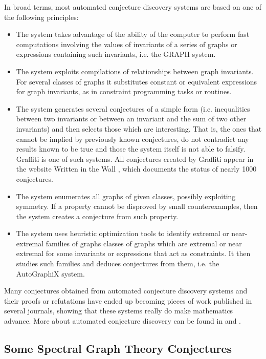 \documentclass[11pt]{article}
\theoremstyle{definition}
\begin{document}
In broad terms, most automated conjecture discovery systems are based on one of the following principles: 

\begin{itemize}[label=\raisebox{0.25ex}{\tiny$\bullet$}]
    \item The system takes advantage of the ability of the computer to perform fast computations involving the values of invariants of a series of graphs or expressions containing such invariants, i.e. the GRAPH system.
    \item The system exploits compilations of relationships between graph invariants. For several classes of graphs it substitutes constant or equivalent expressions for graph invariants, as in constraint programming tasks or routines.
    \item The system generates several conjectures of a simple form (i.e. inequalities between two invariants or between an invariant and the sum of two other invariants) and then selects those which are interesting. That is, the ones that cannot be implied by previously known conjectures, do not contradict any results known to be true and those the system itself is not able to falsify. Graffiti is one of such systems. All conjectures created by Graffiti appear in the website Written in the Wall \cite{WrittenWall}, which documents the status of nearly 1000 conjectures.
    \item The system enumerates all graphs of given classes, possibly exploiting symmetry. If a property cannot be disproved by small counterexamples, then the system creates a conjecture from such property. 
    \item The system uses heuristic optimization tools to identify extremal or near-extremal families of graphs classes of graphs which are extremal or near extremal for some invariants or expressions that act as constraints. It then studies such families and deduces conjectures from them, i.e. the AutoGraphiX system.
\end{itemize}

Many conjectures obtained from automated conjecture discovery systems and their proofs or refutations have ended up becoming pieces of work published in several journals, showing that these systems really do make mathematics advance.
More about automated conjecture discovery can be found in \cite{zbMATH05689445} and \cite{zbMATH02041897}. 

\subsection{Some Spectral Graph Theory Conjectures} \label{subsection conjectures}
\end{document}
